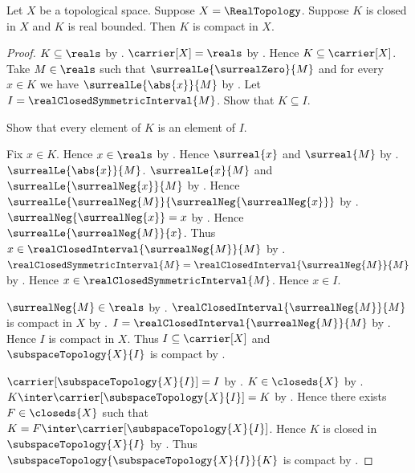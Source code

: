 \begin{theorem}\label{closed_bounded_real_subset_is_compact}
    Let $X$ be a topological space.
    Suppose $X=\RealTopology$.
    Suppose $K$ is closed in $X$ and $K$ is real bounded.
    Then $K$ is compact in $X$.
\end{theorem}
\begin{proof}
    $K\subseteq\reals$ by .
    $\carrier[X]=\reals$ by .
    Hence $K\subseteq\carrier[X]$.
    Take $M\in\reals$ such that $\surrealLe{\surrealZero}{M}$ and
        for every $x\in K$ we have $\surrealLe{\abs{x}}{M}$ by
        .
    Let $I=\realClosedSymmetricInterval{M}$.
    Show that $K\subseteq I$.
    \begin{subproof}
        Show that every element of $K$ is an element of $I$.
        \begin{subproof}
            Fix $x\in K$.
            Hence $x\in\reals$ by .
            Hence $\surreal{x}$ and $\surreal{M}$ by
                .
            $\surrealLe{\abs{x}}{M}$.
            $\surrealLe{x}{M}$ and
                $\surrealLe{\surrealNeg{x}}{M}$ by
                .
            Hence $\surrealLe{\surrealNeg{M}}
                {\surrealNeg{\surrealNeg{x}}}$ by
                .
            $\surrealNeg{\surrealNeg{x}}=x$ by
                .
            Hence $\surrealLe{\surrealNeg{M}}{x}$.
            Thus $x\in\realClosedInterval{\surrealNeg{M}}{M}$ by
                .
            $\realClosedSymmetricInterval{M}
                =\realClosedInterval{\surrealNeg{M}}{M}$ by
                .
            Hence $x\in\realClosedSymmetricInterval{M}$.
            Hence $x\in I$.
        \end{subproof}
    \end{subproof}
    $\surrealNeg{M}\in\reals$ by
        .
    $\realClosedInterval{\surrealNeg{M}}{M}$ is compact in $X$ by
        .
    $I=\realClosedInterval{\surrealNeg{M}}{M}$ by
        .
    Hence $I$ is compact in $X$.
    Thus $I\subseteq\carrier[X]$ and
        $\subspaceTopology{X}{I}$ is compact by .

    $\carrier[\subspaceTopology{X}{I}]=I$ by
        .
    $K\in\closeds{X}$ by .
    $K\inter\carrier[\subspaceTopology{X}{I}]=K$ by
        .
    Hence there exists $F\in\closeds{X}$ such that
        $K=F\inter\carrier[\subspaceTopology{X}{I}]$.
    Hence $K$ is closed in $\subspaceTopology{X}{I}$ by
        .
    Thus $\subspaceTopology{\subspaceTopology{X}{I}}{K}$ is compact by
        .


\end{proof}
